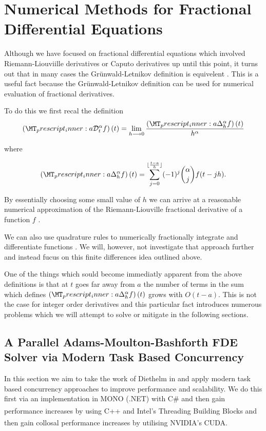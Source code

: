 
\section{Numerical Methods for Fractional Differential Equations}

Although we have focused on fractional differential equations which involved Riemann-Liouviille derivatives or Caputo derivatives up until this point, it turns out that in many cases the Gr{\"u}nwald-Letnikov definition is equivelent \cite{Podlubny1999}. This is a useful fact because the Gr{\"u}nwald-Letnikov definition can be used for numerical evaluation of fractional derivatives. 

To do this we first recal the definition
$$
    \rld{a}{t}{\alpha}{f}(t) = \lim_{h \lra 0} \frac{\fracdelta{a}{\alpha}{h}{f}(t)}{h^\alpha}
$$

where

$$
    \fracdelta{a}{\alpha}{h}{f}(t) = \sum_{j=0}^{\lfloor \frac{t-a}{h} \rfloor} (-1)^j {\alpha \choose j } f(t-jh).
$$

By essentially choosing some small value of $ h $ we can arrive at a reasonable numerical approximation of the Riemann-Liouville fractional derivative of a function $ f $ \cite{Podlubny1999}.

We can also use quadrature rules to numerically fractionally integrate and differentiate functions \cite{Podlubny1999}. We will, however, not investigate that approach further and instead fucus on this finite differences idea outlined above.

One of the things which sould become immediatly apparent from the above definitions is that at $ t $ goes far away from $ a $ the number of terms in the sum which defines $ \fracdelta{a}{\alpha}{h}{f}(t) $ grows with $ O(t-a) $. This is not the case for integer order derivatives and this particular fact introduces numerous problems which we will attempt to solve or mitigate in the following sections.

\subsection{A Parallel Adams-Moulton-Bashforth FDE Solver via Modern Task Based Concurrency}
In this section we aim to take the work of Diethelm in \cite{Diethelm2011} and apply modern task based concurrency approaches to improve performance and scalability. We do this first via an implementation in MONO (.NET) with C\# and then gain performance increases by using C++ and Intel\textsuperscript{{\textregistered}}'s Threading Building Blocks and then gain collosal performance increases by utilising NVIDIA\textsuperscript{{\textregistered}}'s CUDA\textsuperscript{{\textregistered}}. 

